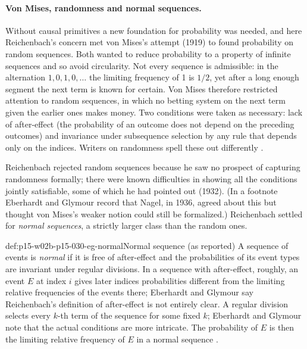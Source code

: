 \paragraph{Von Mises, randomness and normal sequences.} Without causal
primitives a new foundation for probability was needed, and here
Reichenbach's concern met von Mises's attempt (1919) to found
probability on random sequences. Both wanted to reduce probability to a
property of infinite sequences and so avoid circularity. Not every
sequence is admissible: in the alternation \(1,0,1,0,\ldots\) the
limiting frequency of 1 is \(1/2\), yet after a long enough segment the
next term is known for certain. Von Mises therefore restricted attention
to random sequences, in which no betting system on the next term given
the earlier ones makes money. Two conditions were taken as necessary:
lack of after-effect (the probability of an outcome does not depend on
the preceding outcomes) and invariance under subsequence selection by
any rule that depends only on the indices. Writers on randomness spell these out
differently \cite[pp.~364--365]{EberhardtGlymour2011ReichenbachReading}.

Reichenbach rejected random sequences because he saw no prospect of
capturing randomness formally; there were known difficulties in showing
all the conditions jointly satisfiable, some of which he had pointed out
(1932). (In a footnote Eberhardt and Glymour record that Nagel, in 1936, agreed
about this but thought von Mises's weaker notion could still be
formalized.) Reichenbach settled for \emph{normal sequences}, a strictly
larger class than the random ones.

\begin{hbdefinition}{def:p15-w02b-p15-030-eg-normal}{Normal sequence (as reported)}
A sequence of events is \emph{normal} if it is free of after-effect and
the probabilities of its event types are invariant under regular
divisions. In a sequence with after-effect, roughly, an event \(E\) at
index \(i\) gives later indices probabilities different from the
limiting relative frequencies of the events there; Eberhardt and Glymour say
Reichenbach's definition of after-effect is not entirely clear. A
regular division selects every \(k\)-th term of the sequence for some
fixed \(k\); Eberhardt and Glymour note that the actual conditions are more
intricate. The probability of \(E\) is then the limiting relative
frequency of \(E\) in a normal sequence
\cite[p.~365 and n.~4]{EberhardtGlymour2011ReichenbachReading}.
\end{hbdefinition}

